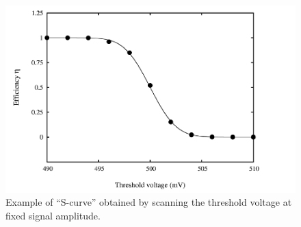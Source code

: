 \begin{figure}[H]
	\centering
	\includegraphics[width=0.65\linewidth]{IMG/ch5/THexample}
	\caption{Example of “S-curve” obtained by scanning the threshold voltage at fixed signal amplitude.}
	\label{fig:thexample}
\end{figure}
